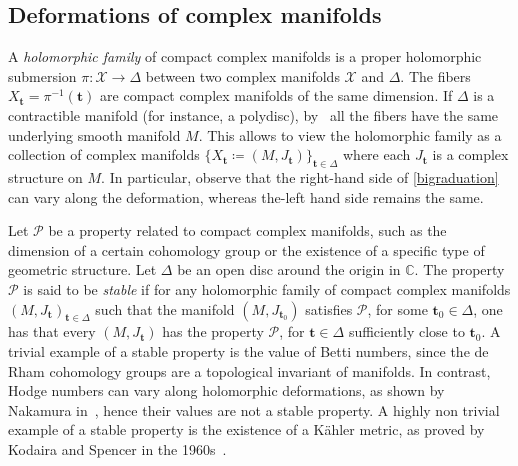 \documentclass[a4paper]{amsart}
\theoremstyle{definition}
\theoremstyle{remark}
\numberwithin{equation}{section}
\begin{document}
\subsection{Deformations of complex manifolds} A \emph{holomorphic family} of compact complex manifolds is a proper holomorphic submersion $\pi\colon\mathcal X\to\Delta$ between two complex manifolds $\mathcal X$ and $\Delta$. The fibers $X_{\mathbf t}=\pi^{-1}(\mathbf t)$ are compact complex manifolds of the same dimension. If $\Delta$ is a contractible manifold (for instance, a polydisc), by~\cite{ehresmann} all the fibers have the same underlying smooth manifold $M$. This allows to view the holomorphic family as a collection of complex manifolds 
$\{X_{\mathbf t}\coloneqq(M,J_{\mathbf t})\}_{\mathbf t\in\Delta}$ where each $J_{\mathbf t}$ is a complex structure on $M$. %
In particular, observe that the right-hand side of \eqref{bigraduation} can vary along the deformation, whereas the-left hand side remains the same.

Let $\mathcal P$ be a property related to compact complex manifolds, such as the dimension of a certain cohomology group or the existence of a specific type of geometric structure. Let $\Delta$ be an open disc around the origin in $\mathbb C$. The property $\mathcal P$ is said to be \emph{stable} if for any holomorphic family of compact complex manifolds $(M,J_{\mathbf t})_{\mathbf t\in\Delta}$ such that the manifold $(M,J_{\mathbf t_0})$ satisfies $\mathcal P$, for some $\mathbf t_0\in\Delta$, one has that every $(M,J_{\mathbf t})$ has the property $\mathcal P$, for $\mathbf t\in\Delta$ sufficiently close to $\mathbf t_0$. A trivial example of a stable property is the value of Betti numbers, since the de Rham cohomology groups are a topological invariant of manifolds. In contrast, Hodge numbers can vary along holomorphic deformations, as shown by Nakamura in~\cite{nakamura}, hence their values are not a stable property. A highly non trivial example of a stable property is the existence of a K\"ahler metric, as proved by Kodaira and Spencer in the 1960s~\cite{kodaira-spencer}. %
\end{document}
